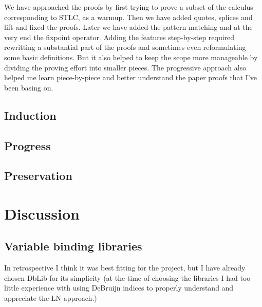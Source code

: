 \documentclass[runningheads]{article}
\begin{document}
We have approached the proofs by first trying to prove a subset of the calculus corresponding to STLC, as a warmup. Then we have added quotes, splices and lift and fixed the proofs. Later we have added the pattern matching and at the very end the fixpoint operator. Adding the features step-by-step required rewritting a substantial part of the proofs and sometimes even reformulating some basic definitions. But it also helped to keep the scope more manageable by dividing the proving effort into smaller pieces. The progressive approach also helped me learn piece-by-piece and better understand the paper proofs that I've been basing on.

\subsection{Induction}


\subsection{Progress}


\subsection{Preservation}



\section{Discussion}
\subsection{Variable binding libraries}
\label{binderlibs}


 In retrospective I think it  was best fitting for the project, but I have already chosen DbLib for its simplicity (at the time of choosing the libraries I had too little experience with using DeBruijn indices to properly understand and appreciate the LN approach.) 
\end{document}
